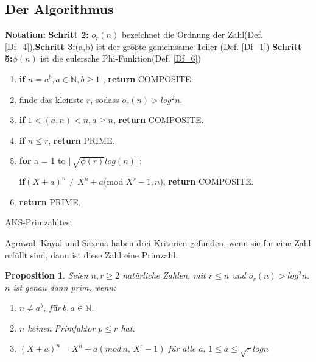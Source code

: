 \documentclass[12pt,oneside]{article}
\newtheorem{prop}{Proposition}[section]
\theoremstyle{remark}
\theoremstyle{definition}
\begin{document}
\subsection{Der Algorithmus}\label{algo}
\textbf{Notation:}\newline
\textbf{Schritt 2: }$o_r(n)$ bezeichnet die Ordnung der
Zahl(Def. \ref{Df_4}).\newline \textbf{Schritt 3:}(a,b) ist der größte gemeinsame Teiler (Def. \ref{Df_1})
\newline \textbf{Schritt 5:}$\phi(n)$ ist die eulersche Phi-Funktion(Def. \ref{Df_6})  
\begin{algorithm}[H]
\SetAlgoLined
{}

\begin{enumerate}
\item \textbf{if} $n = a^b, a \in \mathbb{N}, b \geq 1$ , \textbf{return} COMPOSITE.
\item  finde das kleinste $r$, sodass $o_{r}(n) > log^2 n $.
\item \textbf{if} $1 < (a,n) < n, a \geq n $, \textbf{return} COMPOSITE.
\item \textbf{if} $n \leq r $, \textbf{return} PRIME.
\item \textbf{for} a = 1 to $\lfloor \sqrt{\phi(r)}log(n) \rfloor$:

 \textbf{if}$(X + a)^n \neq X^n + a $(mod $X^r - 1, n$), \textbf{return} COMPOSITE.
 \item \textbf{return} PRIME.
\end{enumerate}
 
\caption{AKS-Primzahltest}
\end{algorithm}

Agrawal, Kayal und Saxena haben drei Kriterien gefunden, wenn sie für eine Zahl erfüllt sind, dann ist diese Zahl eine Primzahl. 

\begin{prop}\label{aks-prop}
Seien $n,r \geq 2$  natürliche Zahlen, mit $ r \leq n$ und $o_{r}(n) > log^2 n$. $n$ ist genau dann prim, wenn:
\begin{enumerate}
    \item $n \neq a^b, \, für \,  b,a \in \mathbb{N}$.
    \item $n$ keinen Primfaktor $p \leq r$ hat.
    \item $(X + a)^n = X^n + a (mod \, n, \, X^r - 1)$ für alle $ a, \, 1 \leq a \leq \sqrt{r} log n$
\end{enumerate}
\end{prop}
\end{document}
